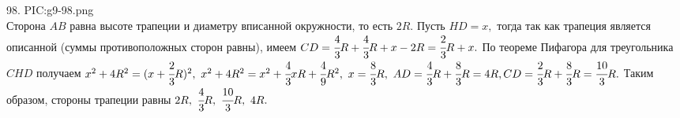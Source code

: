 98. {{PIC:g9-98.png}}\\
Сторона $AB$ равна высоте трапеции и диаметру вписанной окружности, то есть $2R.$ Пусть $HD=x,$ тогда так как трапеция является описанной (суммы противоположных сторон равны), имеем $CD=\cfrac{4}{3}R+\cfrac{4}{3}R+x-2R=\cfrac{2}{3}R+x.$ По теореме Пифагора для треугольника $CHD$ получаем $x^2+4R^2=(x+\cfrac{2}{3}R)^2,\
x^2+4R^2=x^2+\cfrac{4}{3}xR+\cfrac{4}{9}R^2,\ x=\cfrac{8}{3}R,\ AD=\cfrac{4}{3}R+\cfrac{8}{3}R=4R, CD=\cfrac{2}{3}R+\cfrac{8}{3}R=\cfrac{10}{3}R.$ Таким образом,
стороны трапеции равны $2R,\ \cfrac{4}{3}R,\ \cfrac{10}{3}R,\ 4R.$\\

